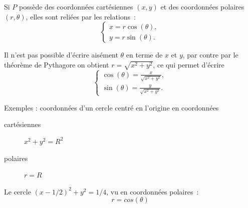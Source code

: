 \documentclass[french,xcolor=svgnames]{beamer}
\begin{document}
\begin{frame}
  Si $P$ possède des coordonnées cartésiennes $(x,y)$ et des coordonnées
polaires $(r,\theta)$, elles sont reliées par les relations~:
\begin{equation*}
  \begin{cases}
    x = r \cos (\theta),\\
    y = r \sin (\theta).
  \end{cases}
\end{equation*}
\begin{remark}
  Il n'est pas possible d'écrire aisément $\theta$ en terme de $x$ et
  $y$, par contre par le théorème de Pythagore on obtient $r =
  \sqrt{x^{2}+y^{2}}$, ce qui permet d'écrire
  \begin{equation*}
    \begin{cases}
      \cos(\theta) = \frac{x}{\sqrt {x^{2}+y^{2}}},\\
      \sin(\theta) = \frac{y}{\sqrt {x^{2}+y^{2}}}.
    \end{cases}
  \end{equation*}
\end{remark}
\end{frame}
\begin{frame}
  Exemples : coordonnées d'un cercle centré en l'origine en coordonnées
  \begin{description}
  \item[cartésiennes] \(x^{2} + y^{2} = R^{2}\)
  \item[polaires] \(r = R\)
  \end{description}\pause

  Le cercle \((x-1/2)^{2} + y^{2} = 1/4\), vu en coordonnées polaires~:
  \begin{equation*}
    r = cos(\theta)
  \end{equation*}
\end{frame}
\end{document}

